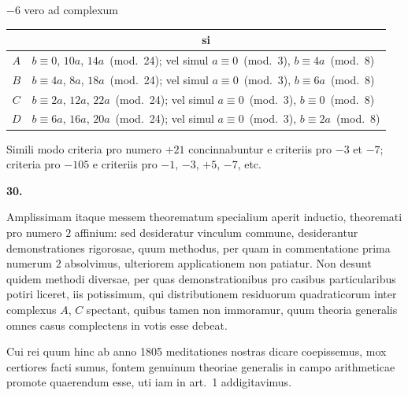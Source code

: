 \documentclass[12pt,a4paper]{article}
\newcommand{\art}[1]{\begin{center}\textbf{#1.}\end{center}}
\begin{document}
$-6$ vero ad complexum

\begin{center}
\begin{tabular}{c|l}
& \multicolumn{1}{c}{si} \\
\hline
$A$ & $b \equiv 0$, $10a$, $14a$~(mod.~24); vel simul $a \equiv 0$~(mod.~3), $b \equiv 4a$~(mod.~8) \\
$B$ & $b \equiv 4a$, $8a$, $18a$~(mod.~24); vel simul $a \equiv 0$~(mod.~3), $b \equiv 6a$~(mod.~8) \\
$C$ & $b \equiv 2a$, $12a$, $22a$~(mod.~24); vel simul $a \equiv 0$~(mod.~3), $b \equiv 0$~(mod.~8) \\
$D$ & $b \equiv 6a$, $16a$, $20a$~(mod.~24); vel simul $a \equiv 0$~(mod.~3), $b \equiv 2a$~(mod.~8)
\end{tabular}
\end{center}

Simili modo criteria pro numero $+21$ concinnabuntur e criteriis pro $-3$ et $-7$; criteria pro $-105$ e criteriis pro $-1$, $-3$, $+5$, $-7$, etc.

\art{30}

Amplissimam itaque messem theorematum specialium aperit inductio, theoremati pro numero $2$ affinium: sed desideratur vinculum commune, desiderantur demonstrationes rigorosae, quum methodus, per quam in commentatione prima numerum $2$ absolvimus, ulteriorem applicationem non patiatur. Non desunt quidem methodi diversae, per quas demonstrationibus pro casibus particularibus potiri liceret, iis potissimum, qui distributionem residuorum quadraticorum inter complexus $A$, $C$ spectant, quibus tamen non immoramur, quum theoria generalis omnes casus complectens in votis esse debeat.

Cui rei quum hinc ab anno 1805 meditationes nostras dicare coepissemus, mox certiores facti sumus, fontem genuinum theoriae generalis in campo arithmeticae promote quaerendum esse, uti iam in art.~1 addigitavimus.
\end{document}
